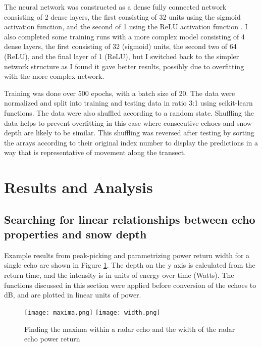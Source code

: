 \documentclass[11pt, a4paper]{article}
\begin{document}
The neural network was constructed as a dense fully connected network consisting of 2 dense layers,  the first consisting of 32 units using the sigmoid activation function, and the second of 1 using the ReLU activation function \cite{ReLU}. I also completed some training runs with a more complex model consisting of 4 dense layers, the first consisting of 32 (sigmoid) units, the second two of 64 (ReLU), and the final layer of 1 (ReLU), but I switched back to the simpler network structure as I found it gave better results, possibly due to overfitting with the more complex network. 

Training was done over 500 epochs, with a batch size of 20. The data were normalized and split into training and testing data in ratio 3:1 using scikit-learn functions. The data were also shuffled according to a random state.  Shuffling the data helps to prevent overfitting in this case where consecutive echoes and snow depth are likely to be similar. This shuffling was reversed after testing by sorting the arrays according to their original index number to display the predictions in a way that is representative of movement along the transect.

\section{Results and Analysis}

\subsection{Searching for linear relationships between echo properties and snow depth}
Example results from peak-picking and parametrizing power return width for a single echo are shown in Figure \ref{fig:points}. The depth on the y axis is calculated from the return time, and the intensity is in units of energy over time (Watts). The functions discussed in this section were applied before conversion of the echoes to dB, and are plotted in linear units of power.

\begin{figure}[H]
   		 \texttt{[image: maxima.png]}
   		 \texttt{[image: width.png]}
    		\caption{Finding the maxima within a radar echo and the width of the radar echo power return}
	\label{fig:points}
\end{figure}
\end{document}
